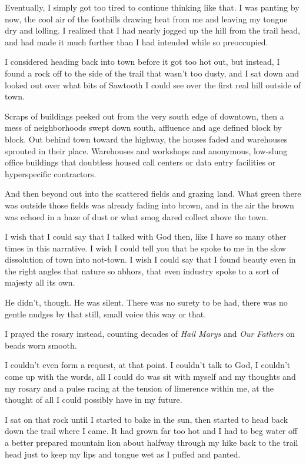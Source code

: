 Eventually, I simply got too tired to continue thinking like that. I was panting by now, the cool air of the foothills drawing heat from me and leaving my tongue dry and lolling. I realized that I had nearly jogged up the hill from the trail head, and had made it much further than I had intended while so preoccupied.

I considered heading back into town before it got too hot out, but instead, I found a rock off to the side of the trail that wasn't too dusty, and I sat down and looked out over what bits of Sawtooth I could see over the first real hill outside of town.

Scraps of buildings peeked out from the very south edge of downtown, then a mess of neighborhoods swept down south, affluence and age defined block by block. Out behind town toward the highway, the houses faded and warehouses sprouted in their place. Warehouses and workshops and anonymous, low-slung office buildings that doubtless housed call centers or data entry facilities or hyperspecific contractors.

And then beyond out into the scattered fields and grazing land. What green there was outside those fields was already fading into brown, and in the air the brown was echoed in a haze of dust or what smog dared collect above the town.

I wish that I could say that I talked with God then, like I have so many other times in this narrative. I wish I could tell you that he spoke to me in the slow dissolution of town into not-town. I wish I could say that I found beauty even in the right angles that nature so abhors, that even industry spoke to a sort of majesty all its own.

He didn't, though. He was silent. There was no surety to be had, there was no gentle nudges by that still, small voice this way or that.

I prayed the rosary instead, counting decades of \emph{Hail Marys} and \emph{Our Fathers} on beads worn smooth.

I couldn't even form a request, at that point. I couldn't talk to God, I couldn't come up with the words, all I could do was sit with myself and my thoughts and my rosary and a pulse racing at the tension of limerence within me, at the thought of all I could possibly have in my future.

I sat on that rock until I started to bake in the sun, then started to head back down the trail where I came. It had grown far too hot and I had to beg water off a better prepared mountain lion about halfway through my hike back to the trail head just to keep my lips and tongue wet as I puffed and panted.


